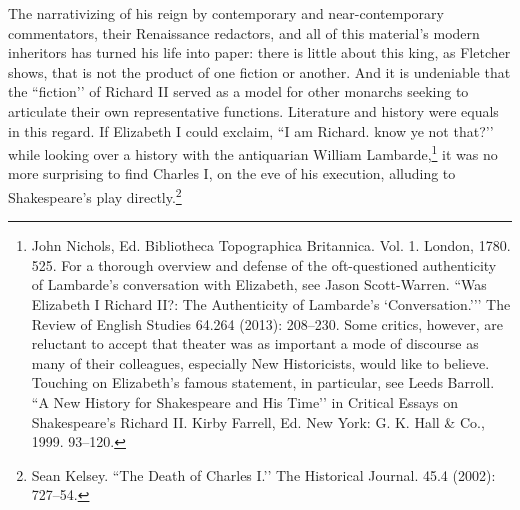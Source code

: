 The narrativizing of his reign by contemporary and near-contemporary commentators, their Renaissance redactors, and all of this material’s modern inheritors has turned his life into paper: there is little about this king, as Fletcher shows, that is not the product of one fiction or another.
And it is undeniable that the ``fiction’’ of Richard II served as a model for other monarchs seeking to articulate their own representative functions.
Literature and history were equals in this regard.
If Elizabeth I could exclaim, ``I am Richard.
know ye not that?’’ while looking over a history with the antiquarian William Lambarde,\footnote{John Nichols, Ed. Bibliotheca Topographica Britannica. Vol. 1. London, 1780. 525.
For a thorough overview and defense of the oft-questioned authenticity of Lambarde’s conversation with Elizabeth, see Jason Scott-Warren.
``Was Elizabeth I Richard II?: The Authenticity of Lambarde’s ‘Conversation.’’’ The Review of English Studies 64.264 (2013): 208--230.
Some critics, however, are reluctant to accept that theater was as important a mode of discourse as many of their colleagues, especially New Historicists, would like to believe.
Touching on Elizabeth’s famous statement, in particular, see Leeds Barroll.
``A New History for Shakespeare and His Time’’ in Critical Essays on Shakespeare’s Richard II. Kirby Farrell, Ed. New York: G. K. Hall \& Co., 1999. 93--120.} it was no more surprising to find Charles I, on the eve of his execution, alluding to Shakespeare’s play directly.\footnote{Sean Kelsey. ``The Death of Charles I.’’ The Historical Journal. 45.4 (2002): 727--54.}

